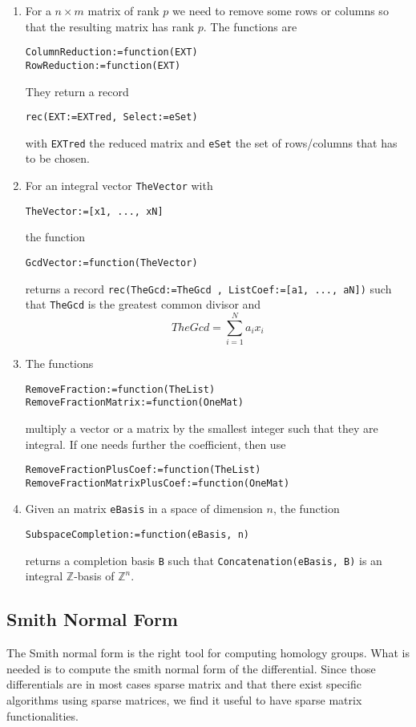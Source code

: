 \documentclass[12pt]{amsart}
\newcommand{\ZZ}{\ensuremath{\mathbb{Z}}}
\begin{document}
\begin{enumerate}
\item For a $n\times m$ matrix of rank $p$ we need to remove
some rows or columns so that the resulting matrix has rank $p$.
The functions are
\begin{verbatim}
ColumnReduction:=function(EXT)
RowReduction:=function(EXT)
\end{verbatim}
They return a record 
\begin{verbatim}
rec(EXT:=EXTred, Select:=eSet)
\end{verbatim}
with {\tt EXTred} the reduced matrix and {\tt eSet} the set of rows/columns
that has to be chosen.

\item For an integral vector {\tt TheVector} with
\begin{verbatim}
TheVector:=[x1, ..., xN]
\end{verbatim}
the function
\begin{verbatim}
GcdVector:=function(TheVector)
\end{verbatim}
returns a record {\tt rec(TheGcd:=TheGcd , ListCoef:=[a1, ..., aN])}
such that {\tt TheGcd} is the greatest common divisor and
\begin{equation*}
TheGcd = \sum_{i=1}^{N} a_i x_i
\end{equation*}

\item The functions
\begin{verbatim}
RemoveFraction:=function(TheList)
RemoveFractionMatrix:=function(OneMat)
\end{verbatim}
multiply a vector or a matrix by the smallest integer such that they are integral. If one needs further the coefficient, then use
\begin{verbatim}
RemoveFractionPlusCoef:=function(TheList)
RemoveFractionMatrixPlusCoef:=function(OneMat)
\end{verbatim}

\item Given an matrix {\tt eBasis} in a space of dimension $n$, the function
\begin{verbatim}
SubspaceCompletion:=function(eBasis, n)
\end{verbatim}
returns a completion basis {\tt B} such that {\tt Concatenation(eBasis, B)} is an integral $\ZZ$-basis of $\ZZ^n$.


\end{enumerate}

\subsection{Smith Normal Form}
The Smith normal form is the right tool for computing homology groups. What is needed is to compute the smith normal form of the differential. Since those differentials are in most cases sparse matrix and that there exist specific algorithms using sparse matrices, we find it useful to have sparse matrix functionalities.
\end{document}
